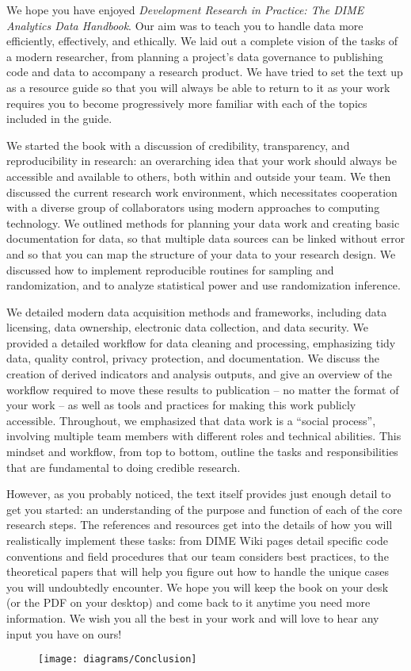 We hope you have enjoyed \textit{Development Research in Practice: The DIME Analytics Data Handbook}.
Our aim was to teach you to handle data more efficiently, effectively, and ethically.
We laid out a complete vision of the tasks of a modern researcher,
from planning a project's data governance to publishing code and data
to accompany a research product.
We have tried to set the text up as a resource guide
so that you will always be able to return to it
as your work requires you to become progressively more familiar
with each of the topics included in the guide.

We started the book with a discussion of 
credibility, transparency, and reproducibility in research:
an overarching idea that your work should always be
accessible and available to others, both within and outside your team.
We then discussed the current research work environment,
which necessitates cooperation with a diverse group of collaborators
using modern approaches to computing technology.
We outlined methods for planning your data work
and creating basic documentation for data,
so that multiple data sources can be linked without error
and so that you can map the structure of your data
to your research design.
We discussed how to implement reproducible routines for sampling and randomization,
and to analyze statistical power and use randomization inference.

We detailed modern data acquisition methods and frameworks,
including data licensing, data ownership,
electronic data collection, and data security.
We provided a detailed workflow for data cleaning and processing,
emphasizing tidy data, quality control, privacy protection, and documentation.
We discuss the creation of derived indicators and analysis outputs,
and give an overview of the workflow required to move these results
to publication -- no matter the format of your work --
as well as tools and practices for making this work publicly accessible.
Throughout, we emphasized that data work is a ``social process'',
involving multiple team members with different roles and technical abilities.
This mindset and workflow, from top to bottom,
outline the tasks and responsibilities
that are fundamental to doing credible research.

However, as you probably noticed, the text itself provides
just enough detail to get you started:
an understanding of the purpose and function of each of the core research steps.
The references and resources get into the details
of how you will realistically implement these tasks:
from DIME Wiki pages detail specific code conventions
and field procedures that our team considers best practices,
to the theoretical papers that will help you figure out
how to handle the unique cases you will undoubtedly encounter.
We hope you will keep the book on your desk
(or the PDF on your desktop)
and come back to it anytime you need more information.
We wish you all the best in your work
and will love to hear any input you have on ours!

\vspace{1cm}
\begin{fullwidth}
	\begin{figure}
		\centering
		\texttt{[image: diagrams/Conclusion]}
		\caption{}
		\label{fig:intro}
	\end{figure}
\end{fullwidth}
